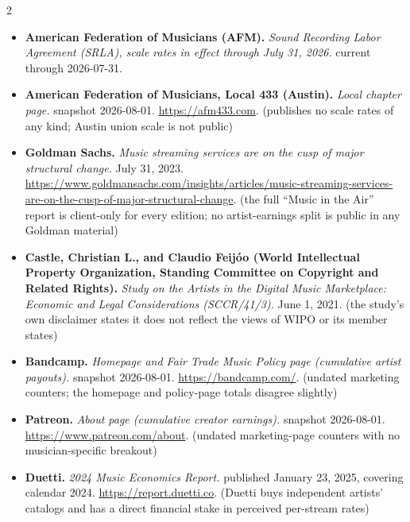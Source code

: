 {\begin{multicols}{2}
\begin{itemize}[itemsep=0pt,topsep=1pt,parsep=0pt,partopsep=0pt,leftmargin=1em]
\item \textbf{American Federation of Musicians (AFM).} \textit{Sound Recording Labor Agreement (SRLA), scale rates in effect through July 31, 2026.} current through 2026-07-31.
\item \textbf{American Federation of Musicians, Local 433 (Austin).} \textit{Local chapter page.} snapshot 2026-08-01. \url{https://afm433.com}. {\color{ammuted}(publishes no scale rates of any kind; Austin union scale is not public)}
\item \textbf{Goldman Sachs.} \textit{Music streaming services are on the cusp of major structural change.} July 31, 2023. \url{https://www.goldmansachs.com/insights/articles/music-streaming-services-are-on-the-cusp-of-major-structural-change}. {\color{ammuted}(the full “Music in the Air” report is client-only for every edition; no artist-earnings split is public in any Goldman material)}
\item \textbf{Castle, Christian L., and Claudio Feijóo (World Intellectual Property Organization, Standing Committee on Copyright and Related Rights).} \textit{Study on the Artists in the Digital Music Marketplace: Economic and Legal Considerations (SCCR/41/3).} June 1, 2021. {\color{ammuted}(the study’s own disclaimer states it does not reflect the views of WIPO or its member states)}
\item \textbf{Bandcamp.} \textit{Homepage and Fair Trade Music Policy page (cumulative artist payouts).} snapshot 2026-08-01. \url{https://bandcamp.com/}. {\color{ammuted}(undated marketing counters; the homepage and policy-page totals disagree slightly)}
\item \textbf{Patreon.} \textit{About page (cumulative creator earnings).} snapshot 2026-08-01. \url{https://www.patreon.com/about}. {\color{ammuted}(undated marketing-page counters with no musician-specific breakout)}
\item \textbf{Duetti.} \textit{2024 Music Economics Report.} published January 23, 2025, covering calendar 2024. \url{https://report.duetti.co}. {\color{ammuted}(Duetti buys independent artists’ catalogs and has a direct financial stake in perceived per-stream rates)}
\end{itemize}
\end{multicols}
}

